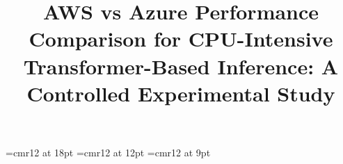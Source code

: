 \documentclass[twocolumn]{article}
\begin{document}
\font\titleFont=cmr12 at 18pt
\font\authorNameFont=cmr12 at 12pt
\font\authorAffiliationFont=cmr12 at 9pt

\title{{\titleFont AWS vs Azure Performance Comparison for CPU-Intensive Transformer-Based Inference: A Controlled Experimental Study}}

\makeatletter
\renewcommand{\maketitle}{%
  \begin{strip}
    \centering
    {\fontsize{18}{22}\bfseries\@title\par}
    \vspace{2em}

    \begin{tabular*}{\textwidth}{@{\extracolsep{\fill}}cc}
      \begin{tabular}[t]{c}
        {\fontsize{12}{14}\selectfont 1st Natan Depes Bilharinho} \\
        {\fontsize{9}{11}\selectfont \textit{Department of Computer Science}} \\
        {\fontsize{9}{11}\selectfont \textit{Universidade Vila Velha}} \\
        {\fontsize{9}{11}\selectfont Vila Velha, Brazil} \\
        {\fontsize{9}{11}\selectfont natandepes@hotmail.com}
      \end{tabular}
      &
      \begin{tabular}[t]{c}
        {\fontsize{12}{14}\selectfont 2nd Carlos Abraão Dordenoni Holanda} \\
        {\fontsize{9}{11}\selectfont \textit{Department of Computer Science}} \\
        {\fontsize{9}{11}\selectfont \textit{Universidade Vila Velha}} \\
        {\fontsize{9}{11}\selectfont Vila Velha, Brazil} \\
        {\fontsize{9}{11}\selectfont carlosholanda404@gmail.com}
      \end{tabular}
    \end{tabular*}

    \vspace{2em}  %

    \begin{tabular}{c}
      \begin{tabular}[t]{c}
        {\fontsize{12}{14}\selectfont 3rd Gabriela Martins de Jesus} \\
        {\fontsize{9}{11}\selectfont \textit{Department of Computer Science}} \\
        {\fontsize{9}{11}\selectfont \textit{Universidade Vila Velha}} \\
        {\fontsize{9}{11}\selectfont Vila Velha, Brazil} \\
        {\fontsize{9}{11}\selectfont gabriela.jesus@uvv.br}
      \end{tabular}
    \end{tabular}

    \vspace{2em}
  \end{strip}
}
\end{document}
